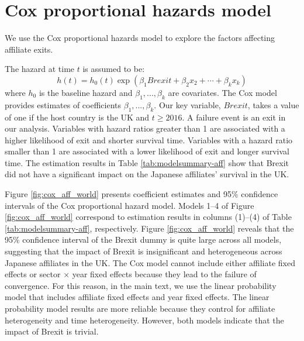 \documentclass[11pt,a4paper, english]{article}
\begin{document}
\section{Cox proportional hazards model}\label{app:cox}

We use the Cox proportional hazards model \citep{cox1972regression} to explore the factors affecting affiliate exits. 

The hazard at time $t$ is assumed to be:
\begin{equation}
h(t)=h_{0}(t) \exp \left(
    \beta_{1} Brexit+
    \beta_{2} x_{2}+\cdots+
    \beta_{k} x_{k}
    \right)
\end{equation}
where $h_{0}$ is the baseline hazard and $\beta_{1},...,\beta_{k}$ are covariates. The Cox model provides estimates of coefficients $\beta_{1},...,\beta_{k}$. Our key variable, $Brexit$, takes a value of one if the host country is the UK and $t \geq 2016$.
A failure event is an exit in our analysis. Variables with hazard ratios greater than 1 are associated with a higher likelihood of exit and shorter survival time. Variables with a hazard ratio smaller than 1 are associated with a lower likelihood of exit and longer survival time.
 The estimation results in Table \ref{tab:modelsummary-aff} show that Brexit did not have a significant impact on the Japanese affiliates' survival in the UK.



{\renewcommand\normalsize{\scriptsize}%
\normalsize 

}



Figure \ref{fig:cox_aff_world} presents coefficient estimates and 95\% confidence intervals of the Cox proportional hazard model.
Models 1--4 of Figure \ref{fig:cox_aff_world} correspond to estimation results in columns (1)--(4) of Table \ref{tab:modelsummary-aff}, respectively.
Figure \ref{fig:cox_aff_world} reveals that the 95\% confidence interval of the Brexit dummy is quite large across all models, suggesting that the impact of Brexit is insignificant and heterogeneous across Japanese affiliates in the UK.
The Cox model cannot include either affiliate fixed effects or sector $\times$ year fixed effects because they lead to the failure of convergence. 
For this reason, in the main text, we use the linear probability model that includes affiliate fixed effects and year fixed effects. 
The linear probability model results are more reliable because they control for affiliate heterogeneity and time heterogeneity. However, both models indicate that the impact of Brexit is trivial.
\end{document}
